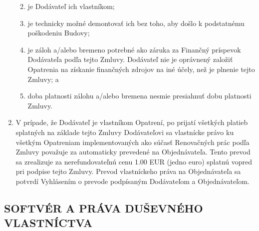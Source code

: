 \begin{multicols}{2}
\begin{enumerate}
  \begin{enumerate}
  \def\labelenumii{\arabic{enumii}.}
  \item
    je Dodávateľ ich vlastníkom;
  \item
    je technicky možné demontovať ich bez toho, aby došlo k podstatnému
    poškodeniu Budovy;
  \item
    je záloh a/alebo bremeno potrebné ako záruka za Finančný príspevok
    Dodávateľa podľa tejto Zmluvy. Dodávateľ nie je oprávnený založiť
    Opatrenia na získanie finančných zdrojov na iné účely, než je
    plnenie tejto Zmluvy; a
  \item
    doba platnosti zálohu a/alebo bremena nesmie presiahnuť dobu
    platnosti Zmluvy.
  \end{enumerate}
\item
  V prípade, že Dodávateľ je vlastníkom Opatrení, po prijatí všetkých
  platieb splatných na základe tejto Zmluvy Dodávateľovi sa vlastnícke
  právo ku všetkým Opatreniam implementovaných ako súčasť Renovačných
  prác podľa Zmluvy považuje za automaticky prevedené na Objednávateľa.
  Tento prevod sa zrealizuje za nerefundovateľnú cenu 1.00 EUR (jedno
  euro) splatnú vopred pri podpise tejto Zmluvy. Prevod vlastníckeho
  práva na Objednávateľa sa potvrdí Vyhlásením o prevode podpísaným
  Dodávateľom a Objednávateľom.
\end{enumerate}

\subsection{SOFTVÉR A PRÁVA DUŠEVNÉHO VLASTNÍCTVA}


\end{multicols}
